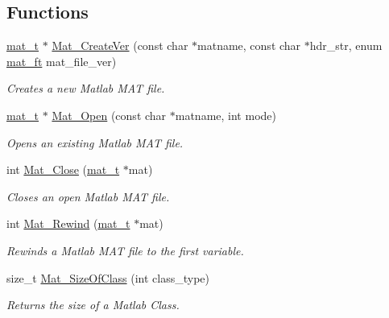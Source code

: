 \subsection*{\-Functions}
\begin{DoxyCompactItemize}
\item 
\hyperlink{group__MAT_gab0fc888f5a5d79943b16284b1f91c2e8}{mat\-\_\-t} $\ast$ \hyperlink{group__MAT_ga22d404f203af7869c841400e7ad247cf}{\-Mat\-\_\-\-Create\-Ver} (const char $\ast$matname, const char $\ast$hdr\-\_\-str, enum \hyperlink{group__MAT_gad03442b8378999189d510e3745c702b7}{mat\-\_\-ft} mat\-\_\-file\-\_\-ver)
\begin{DoxyCompactList}\small\item\em \-Creates a new \-Matlab \-M\-A\-T file. \end{DoxyCompactList}\item 
\hyperlink{group__MAT_gab0fc888f5a5d79943b16284b1f91c2e8}{mat\-\_\-t} $\ast$ \hyperlink{group__MAT_gafbfedb5636a99f0ef867520c47f77d18}{\-Mat\-\_\-\-Open} (const char $\ast$matname, int mode)
\begin{DoxyCompactList}\small\item\em \-Opens an existing \-Matlab \-M\-A\-T file. \end{DoxyCompactList}\item 
int \hyperlink{group__MAT_ga101c92ff7bde4a2d4615661beba09262}{\-Mat\-\_\-\-Close} (\hyperlink{group__MAT_gab0fc888f5a5d79943b16284b1f91c2e8}{mat\-\_\-t} $\ast$mat)
\begin{DoxyCompactList}\small\item\em \-Closes an open \-Matlab \-M\-A\-T file. \end{DoxyCompactList}\item 
int \hyperlink{group__MAT_ga4d6e3892d2e216c507a744ba0e070d0b}{\-Mat\-\_\-\-Rewind} (\hyperlink{group__MAT_gab0fc888f5a5d79943b16284b1f91c2e8}{mat\-\_\-t} $\ast$mat)
\begin{DoxyCompactList}\small\item\em \-Rewinds a \-Matlab \-M\-A\-T file to the first variable. \end{DoxyCompactList}\item 
size\-\_\-t \hyperlink{group__MAT_ga2bf682f015b22fa796a8885e997661e7}{\-Mat\-\_\-\-Size\-Of\-Class} (int class\-\_\-type)
\begin{DoxyCompactList}\small\item\em \-Returns the size of a \-Matlab \-Class. \end{DoxyCompactList}\item 

\end{DoxyCompactItemize}
